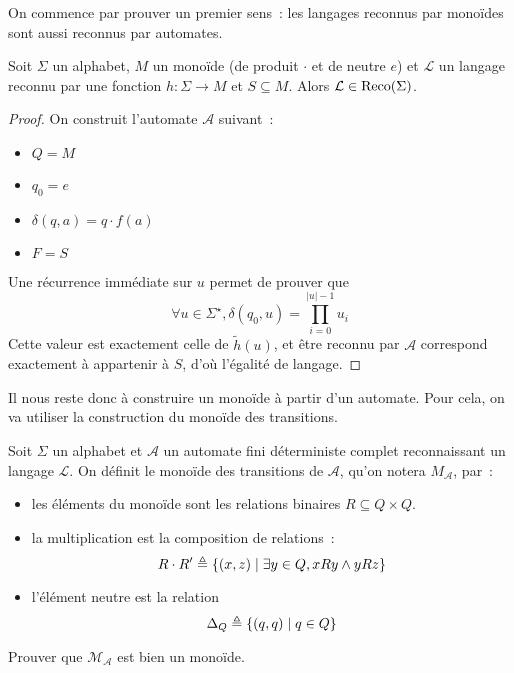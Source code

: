 On commence par prouver un premier sens~: les langages reconnus par monoïdes
sont aussi reconnus par automates.

\begin{proposition}
  Soit $\Sigma$ un alphabet, $M$ un monoïde (de produit $\cdot$ et de neutre
  $e$) et $\mathcal L$ un langage reconnu par une fonction $h : \Sigma \to M$
  et $S\subseteq M$. Alors $\mathcal L \in \operatorname{Reco}(\Sigma)$.
\end{proposition}

\begin{proof}
  On construit l'automate $\mathcal A$ suivant~:
  \begin{itemize}
  \item $Q = M$
  \item $q_0 = e$
  \item $\delta(q,a) = q\cdot f(a)$
  \item $F = S$
  \end{itemize}

  Une récurrence immédiate sur $u$ permet de prouver que
  \[\forall u \in \Sigma^\star, \delta(q_0,u) = \prod_{i = 0}^{|u|-1} u_i\]
  Cette valeur est exactement celle de $\tilde h(u)$, et être reconnu par
  $\mathcal A$ correspond exactement à appartenir à $S$, d'où l'égalité de
  langage.
\end{proof}

Il nous reste donc à construire un monoïde à partir d'un automate. Pour cela,
on va utiliser la construction du monoïde des transitions.

\begin{definition}
  Soit $\Sigma$ un alphabet et $\mathcal A$ un automate fini déterministe
  complet reconnaissant un langage $\mathcal L$. On définit le monoïde des
  transitions de $\mathcal A$, qu'on notera $M_\mathcal A$, par~:
  \begin{itemize}
  \item les éléments du monoïde sont les relations binaires
    $R\subseteq Q\times Q$.
  \item la multiplication est la composition de relations~:
    \[R\cdot R' \triangleq \{(x,z) \mid \exists y \in Q, xRy\land yRz\}\]
  \item l'élément neutre est la relation
    \[\Delta_Q \triangleq \{(q,q)\mid q \in Q\}\]
  \end{itemize}
\end{definition}

\begin{exercise}
  Prouver que $\mathcal M_{\mathcal A}$ est bien un monoïde.
\end{exercise}

